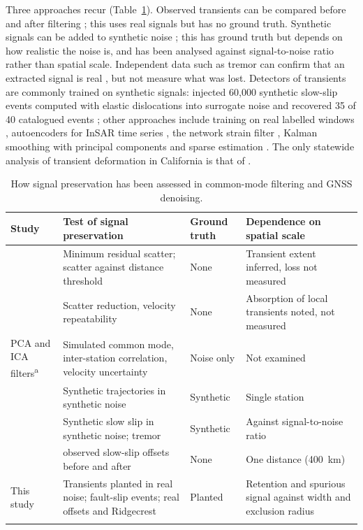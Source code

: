 Three approaches recur (Table~\ref{tab:assessment}). Observed transients can be compared before and after filtering \citep{bachelot2025}; this uses real signals but has no ground truth. Synthetic signals can be added to synthetic noise \citep{costantino2024, mastella2025}; this has ground truth but depends on how realistic the noise is, and has been analysed against signal-to-noise ratio rather than spatial scale. Independent data such as tremor can confirm that an extracted signal is real \citep{costantino2024}, but not measure what was lost. Detectors of transients are commonly trained on synthetic signals: \citet{costantino2023} injected 60,000 synthetic slow-slip events computed with elastic dislocations \citep{okada1992} into surrogate noise and recovered 35 of 40 catalogued events \citep{michel2019}; other approaches include training on real labelled windows \citep{tanaka2025}, autoencoders for InSAR time series \citep{rouetleduc2021}, the network strain filter \citep{ohtani2010}, Kalman smoothing with principal components \citep{jiherring2013} and sparse estimation \citep{riel2014}. The only statewide analysis of transient deformation in California is that of \citet{klein2019}.

\begin{table}[t]
\centering
\caption{How signal preservation has been assessed in common-mode filtering and GNSS denoising.}
\label{tab:assessment}
\small
\begin{tabular}{>{\raggedright\arraybackslash}p{2.8cm} >{\raggedright\arraybackslash}p{4.4cm} >{\raggedright\arraybackslash}p{2.0cm} >{\raggedright\arraybackslash}p{4.2cm}}
\toprule
Study & Test of signal preservation & Ground truth & Dependence on spatial scale \\
\midrule
\citet{tianshen2016} & Minimum residual scatter; scatter against distance threshold & None & Transient extent inferred, loss not measured \\
\citet{kreemer2021} & Scatter reduction, velocity repeatability & None & Absorption of local transients noted, not measured \\
PCA and ICA filters\textsuperscript{a} & Simulated common mode, inter-station correlation, velocity uncertainty & Noise only & Not examined \\
\citet{mastella2025} & Synthetic trajectories in synthetic noise & Synthetic & Single station \\
\citet{costantino2024} & Synthetic slow slip in synthetic noise; tremor & Synthetic & Against signal-to-noise ratio \\
\citet{bachelot2025} & 280 observed slow-slip offsets before and after & None & One distance (400~km) \\
This study & Transients planted in real noise; fault-slip events; real offsets and Ridgecrest & Planted & Retention and spurious signal against width and exclusion radius \\
\bottomrule
\multicolumn{4}{l}{\footnotesize \textsuperscript{a}\,\citet{shen2014, gruszczynski2018, li2020vbpca, zhou2022, liu2026}.}
\end{tabular}
\end{table}

